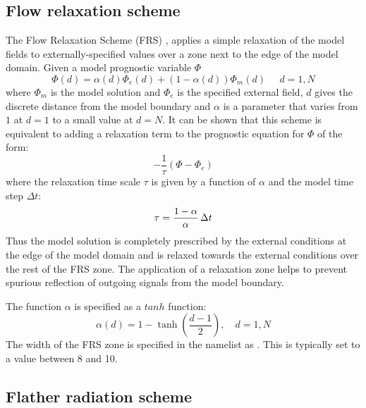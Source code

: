 \documentclass[../tex_main/NEMO_manual]{subfiles}
\begin{document}
\subsection{Flow relaxation scheme}
\label{subsec:BDY_FRS_scheme}

The Flow Relaxation Scheme (FRS) \citep{Davies_QJRMS76,Engerdahl_Tel95},
applies a simple relaxation of the model fields to externally-specified values over
a zone next to the edge of the model domain.
Given a model prognostic variable $\Phi$
\begin{equation}  \label{eq:bdy_frs1}
\Phi(d) = \alpha(d)\Phi_{e}(d) + (1-\alpha(d))\Phi_{m}(d)\;\;\;\;\; d=1,N
\end{equation}
where $\Phi_{m}$ is the model solution and $\Phi_{e}$ is the specified external field,
$d$ gives the discrete distance from the model boundary and
$\alpha$ is a parameter that varies from $1$ at $d=1$ to a small value at $d=N$.
It can be shown that this scheme is equivalent to adding a relaxation term to
the prognostic equation for $\Phi$ of the form:
\begin{equation}  \label{eq:bdy_frs2}
-\frac{1}{\tau}\left(\Phi - \Phi_{e}\right)
\end{equation}
where the relaxation time scale $\tau$ is given by a function of $\alpha$ and the model time step $\Delta t$:
\begin{equation}  \label{eq:bdy_frs3}
\tau = \frac{1-\alpha}{\alpha}  \,\Delta t
\end{equation}
Thus the model solution is completely prescribed by the external conditions at the edge of the model domain and
is relaxed towards the external conditions over the rest of the FRS zone.
The application of a relaxation zone helps to prevent spurious reflection of
outgoing signals from the model boundary. 

The function $\alpha$ is specified as a $tanh$ function:
\begin{equation}  \label{eq:bdy_frs4}
\alpha(d) = 1 - \tanh\left(\frac{d-1}{2}\right),       \quad d=1,N
\end{equation}
The width of the FRS zone is specified in the namelist as .
This is typically set to a value between 8 and 10.

\subsection{Flather radiation scheme}
\label{subsec:BDY_flather_scheme}
\end{document}
